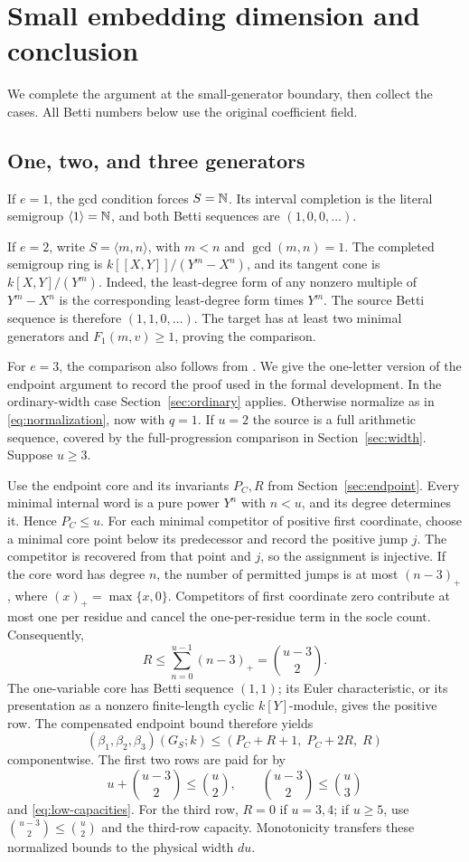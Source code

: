 \section{Small embedding dimension and conclusion}
\label{sec:synthesis}
We complete the argument at the small-generator boundary, then collect
the cases. All Betti numbers below use the original coefficient field.

\subsection{One, two, and three generators}
If $e=1$, the gcd condition forces $S=\mathbb N$. Its interval completion
is the literal semigroup $\langle1\rangle=\mathbb N$, and both Betti sequences
are $(1,0,0,\ldots)$.

If $e=2$, write $S=\langle m,n\rangle$, with $m<n$ and
$\gcd(m,n)=1$. The completed semigroup ring is
$k[[X,Y]]/(Y^m-X^n)$, and its tangent cone is
$k[X,Y]/(Y^m)$. Indeed, the least-degree form of any nonzero multiple
of $Y^m-X^n$ is the corresponding least-degree form times $Y^m$.
The source Betti sequence is therefore $(1,1,0,\ldots)$.
The target has at least two minimal generators and
$F_1(m,v)\ge1$, proving the comparison.

For $e=3$, the comparison also follows from
\cite[Theorem~1.1]{LanTuVu}. We give the one-letter version of the
endpoint argument to record the proof used in the formal development.
In the ordinary-width case Section~\ref{sec:ordinary} applies.
Otherwise normalize as in \eqref{eq:normalization}, now with $q=1$.
If $u=2$ the source is a full arithmetic sequence, covered by the
full-progression comparison in Section~\ref{sec:width}.
Suppose $u\ge3$.

Use the endpoint core and its invariants $P_C,R$ from
Section~\ref{sec:endpoint}. Every minimal internal word is a pure
power $Y^n$ with $n<u$, and its degree determines it. Hence $P_C\le u$.
For each minimal competitor of positive first coordinate, choose a
minimal core point below its predecessor and record the positive jump
$j$. The competitor is recovered from that point and $j$, so the
assignment is injective. If the core word has degree $n$, the number of
permitted jumps is at most $(n-3)_+$, where $(x)_+=\max\{x,0\}$.
Competitors of first coordinate zero contribute at most one per
residue and cancel the one-per-residue term in the socle count.
Consequently,
\[
 R\le\sum_{n=0}^{u-1}(n-3)_+=\binom{u-3}{2}.
\]
The one-variable core has Betti sequence $(1,1)$; its Euler
characteristic, or its presentation as a nonzero finite-length cyclic
$k[Y]$-module, gives the positive row. The compensated endpoint bound
therefore yields
\[
 (\beta_1,\beta_2,\beta_3)(G_S;k)
 \le (P_C+R+1,\;P_C+2R,\;R)
\]
componentwise. The first two rows are paid for by
\[
 u+\binom{u-3}{2}\le\binom u2,\qquad
 \binom{u-3}{2}\le\binom u3
\]
and \eqref{eq:low-capacities}. For the third row, $R=0$ if $u=3,4$;
if $u\ge5$, use $\binom{u-3}{2}\le\binom u2$ and the third-row
capacity. Monotonicity transfers these normalized bounds to the
physical width $du$.

